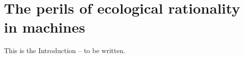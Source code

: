 \chapter{The perils of ecological rationality in machines}
\label{introduction}


This is the Introduction -- to be written.